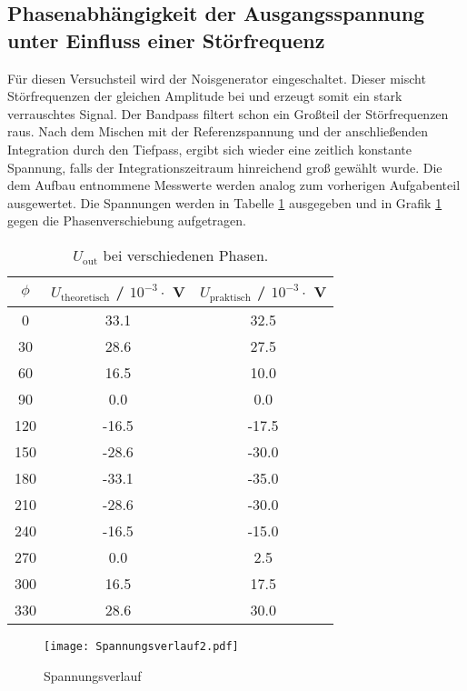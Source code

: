 \subsection{Phasenabhängigkeit der Ausgangsspannung unter Einfluss einer Störfrequenz}
Für diesen Versuchsteil wird der Noisgenerator eingeschaltet. Dieser mischt Störfrequenzen der gleichen Amplitude bei und erzeugt somit ein stark verrauschtes Signal. Der Bandpass filtert schon ein Großteil der Störfrequenzen raus. Nach dem Mischen mit der Referenzspannung und der anschließenden Integration durch den Tiefpass, ergibt sich wieder eine zeitlich konstante Spannung, falls der Integrationszeitraum hinreichend groß gewählt wurde. Die dem Aufbau entnommene Messwerte werden analog zum vorherigen Aufgabenteil ausgewertet. Die Spannungen werden in Tabelle \ref{tab:Uphase2} ausgegeben und in Grafik \ref{fig:Spannungsverlauf} gegen die Phasenverschiebung aufgetragen.

\begin{table}
    \centering
    \begin{tabular}{c c c}
    	\toprule
    	$\phi$ & $U_{\text{theoretisch}}$ / $10^{-3} \cdot $ V & $U_{\text{praktisch}}$ / $10^{-3} \cdot $ V \\
    	\midrule
    	0   &  33.1  &  32.5        \\
    	30  &  28.6  &  27.5        \\
   	  60  &  16.5  &  10.0       \\
    	90  &  0.0   &   0.0        \\
    	120 & -16.5  & -17.5        \\
    	150 & -28.6  & -30.0        \\
    	180 & -33.1  & -35.0        \\
    	210 & -28.6  & -30.0        \\
    	240 & -16.5  & -15.0        \\
    	270 &  0.0   &  2.5         \\
    	300 &  16.5  &  17.5        \\
  	  330 &  28.6  &  30.0        \\
    	\end{tabular}
    \caption{$U_{\text{out}}$ bei verschiedenen Phasen.}
    \label{tab:Uphase2}
\end{table}

\begin{figure}
  \centering
  \texttt{[image: Spannungsverlauf2.pdf]}
  \caption{Spannungsverlauf}
  \label{fig:Spannungsverlauf}
\end{figure}

